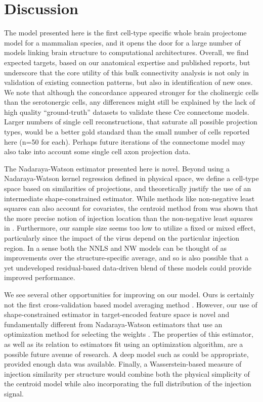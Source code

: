 \section{Discussion}

The model presented here is the first cell-type specific whole brain projectome model for a mammalian species, and it opens the door for a large number of models linking brain structure to computational architectures. 
Overall, we find expected targets, based on our anatomical expertise and published reports, but underscore that the core utility of this bulk connectivity analysis is not only in validation of existing connection patterns, but also in identification of new ones.
We note that although the concordance appeared stronger for the cholinergic cells than the serotonergic cells, any differences might still be explained by the lack of high quality “ground-truth” datasets to validate these Cre connectome models.
Larger numbers of single cell reconstructions, that saturate all possible projection types, would be a better gold standard than the small number of cells reported here (n=50 for each). 
Perhaps future iterations of the connectome model may also take into account some single cell axon projection data.

The Nadaraya-Watson estimator presented here is novel.
Beyond using a Nadaraya-Watson kernel regression defined in physical space, we define a cell-type space based on similarities of projections, and theoretically justify the use of an intermediate shape-constrained estimator. 
While methods like non-negative least squares can also account for covariates, the centroid method from \citet{Knox2019-ot} was shown that the more precise notion of injection location than the non-negative least squares in \citet{Oh2014-kh}.
Furthermore, our sample size seems too low to utilize a fixed or mixed effect, particularly since the impact of the virus depend on the particular injection region.
In a sense both the NNLS and NW models can be thought of as improvements over the structure-specific average, and so is also possible that a yet undeveloped residual-based data-driven blend of these models could provide improved performance.

We see several other opportunities for improving on our model.
Ours is certainly not the first cross-validation based model averaging method \citet{Gao2016-qe}.
However, our use of shape-constrained estimator in target-encoded feature space is novel and fundamentally different from Nadaraya-Watson estimators that use an optimization method for selecting the weights \citep{Saul2003-th}.
The properties of this estimator, as well as its relation to estimators fit using an optimization algorithm, are a possible future avenue of research.
A deep model such as \citet{Lotfollahi2019-tr} could be appropriate, provided enough data was available.
Finally, a Wasserstein-based measure of injection similarity per structure would combine both the physical simplicity of the centroid model while also incorporating the full distribution of the injection signal.

